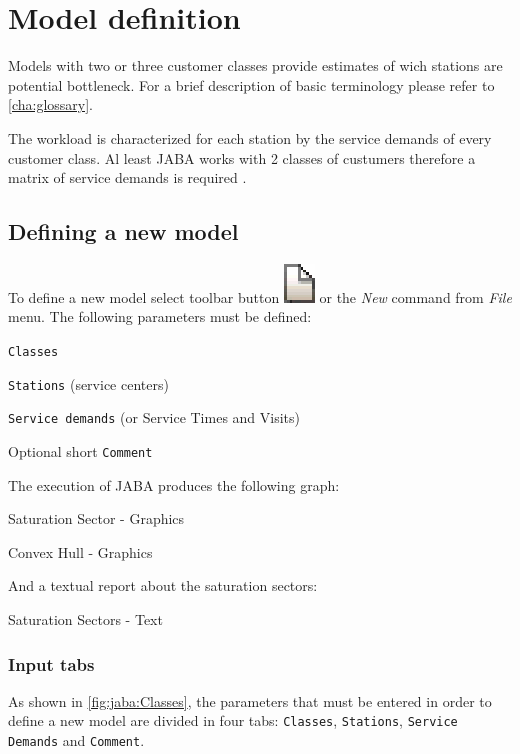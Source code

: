 \section{Model definition}
Models with two or three customer classes provide estimates of wich stations are potential bottleneck.
For a brief description of basic terminology please refer to \autoref{cha:glossary}.

The workload is characterized for each station by the service 
demands of every customer class. 
Al least JABA works with 2 classes of custumers therefore a matrix of 
service demands is required \cite{Lazowska}.

\subsection{Defining a new model}
To define a new model select toolbar button
\includegraphics[scale=.8]{img/jaba/new} or the \emph{New} command
from \emph{File} menu. The following parameters must be defined:
\begin{enumerate*}
\item \texttt{Classes}
\item \texttt{Stations} (service centers)
\item \texttt{Service demands} (or Service Times and Visits)
\item Optional short \texttt{Comment}
\end{enumerate*}

The execution of JABA produces the following graph:

\begin{itemize*}
\item Saturation Sector - Graphics
\item Convex Hull - Graphics
\end{itemize*}

\noindent And a textual report about the saturation sectors:
\begin{itemize*}
\item Saturation Sectors - Text
\end{itemize*}

\subsubsection{Input tabs}
As shown in \autoref{fig:jaba:Classes}, the parameters that
must be entered in order to define a new model are divided in four
tabs: \texttt{Classes}, \texttt{Stations}, \texttt{Service Demands}
and \texttt{Comment}.

